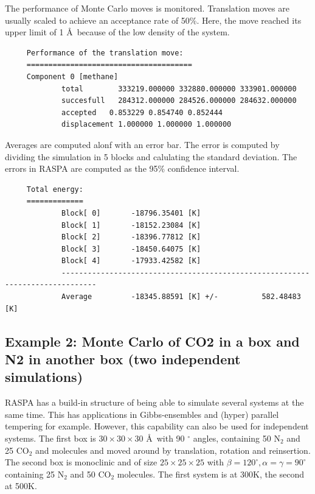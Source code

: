 The performance of Monte Carlo moves is monitored. Translation moves are usually scaled to achieve an acceptance rate of 50\%.
Here, the move reached its upper limit of 1 \AA\ because of the low density of the system.
\begin{tiny}
\begin{verbatim}
     Performance of the translation move:
     ======================================
     Component 0 [methane]
             total        333219.000000 332880.000000 333901.000000
             succesfull   284312.000000 284526.000000 284632.000000
             accepted   0.853229 0.854740 0.852444
             displacement 1.000000 1.000000 1.000000
\end{verbatim}
\end{tiny}

Averages are computed alonf with an error bar. The error is computed by dividing the simulation in 5 blocks and calulating the standard deviation.
The errors in RASPA are computed as the 95\% confidence interval.
\begin{tiny}
\begin{verbatim}
     Total energy:
     =============
             Block[ 0]       -18796.35401 [K]
             Block[ 1]       -18152.23084 [K]
             Block[ 2]       -18396.77812 [K]
             Block[ 3]       -18450.64075 [K]
             Block[ 4]       -17933.42582 [K]
             ------------------------------------------------------------------------------
             Average         -18345.88591 [K] +/-          582.48483 [K]
\end{verbatim}
\end{tiny}

\subsection*{Example 2: Monte Carlo of CO2 in a box and N2 in another box (two independent simulations)}

RASPA has a build-in structure of being able to simulate several systems at the same time. This has applications in Gibbs-ensembles and (hyper) parallel tempering
for example. However, this capability can also be used for independent systems. The first box is $30\times30\times30$ \AA\ with 90 $^\circ$ angles,
containing 50 N$_2$ and 25 CO$_2$ and molecules and moved around by translation, rotation and reinsertion. The second box is monoclinic 
and of size $25\times25\times25$ with 
$\beta=120^\circ,\alpha=\gamma=90^\circ$ containing 25 N$_2$ and 50 CO$_2$ molecules. The first system is at 300K, the second at 500K. 

